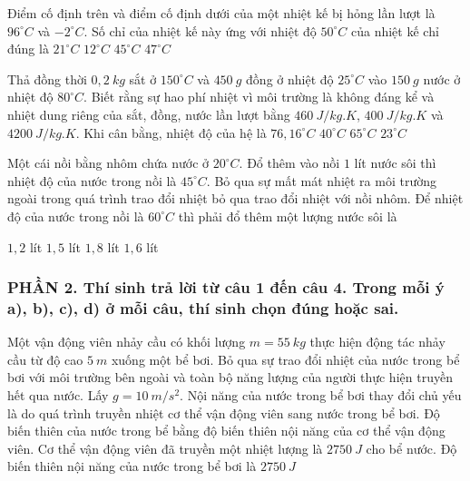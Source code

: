 \begin{ex}
Điểm cố định trên và điểm cố định dưới của một nhiệt kế bị hỏng lần lượt là $96^\circ C$ và $-2^\circ C$. Số chỉ của nhiệt kế này ứng với nhiệt độ $50^\circ C$ của nhiệt kế chỉ đúng là
\choice
{$21^\circ C$}
{$12^\circ C$}
{$45^\circ C$}
{\True $47^\circ C$}
	\loigiai{}
\end{ex}

\begin{ex}
	Thả đồng thời $0,2\ kg$ sắt ở $150^\circ C$ và $450\ g$ đồng ở nhiệt độ $25^\circ C$ vào $150\ g$ nước ở nhiệt độ $80^\circ C$. Biết rằng sự hao phí nhiệt vì môi trường là không đáng kể và nhiệt dung riêng của sắt, đồng, nước lần lượt bằng $460\ J/kg.K$, $400\ J/kg.K$ và $4200\ J/kg.K$. Khi cân bằng, nhiệt độ của hệ là
	\choice
	{\True $76,16^\circ C$}
	{$40^\circ C$}
	{$65^\circ C$}
	{$23^\circ C$}
	\loigiai{}
\end{ex}

\begin{ex}
Một cái nồi bằng nhôm chứa nước ở $20^{\circ}C$. Đổ thêm vào nồi $1$ lít nước sôi thì nhiệt độ của nước trong nồi là $45^{\circ}C$. Bỏ qua sự mất mát nhiệt ra môi trường ngoài trong quá trình trao đổi nhiệt bỏ qua trao đổi nhiệt với nồi nhôm. Để nhiệt độ của nước trong nồi là $60^{\circ}C$ thì phải đổ thêm một lượng nước sôi là

\choice
{\True $1,2$ lít}
{$1,5$ lít}
{$1,8$ lít}
{$1,6$ lít}
	\loigiai{}
\end{ex}
\subsubsection*{PHẦN 2. Thí sinh trả lời từ câu 1 đến câu 4. Trong mỗi ý a), b), c), d) ở mỗi câu, thí sinh chọn đúng hoặc sai.}
\setcounter{ex}{0}
\begin{ex}
	Một vận động viên nhảy cầu có khối lượng $m = 55\ kg$ thực hiện động tác nhảy cầu từ độ cao $5\ m$ xuống một bể bơi. Bỏ qua sự trao đổi nhiệt của nước trong bể bơi với môi trường bên ngoài và toàn bộ năng lượng của người thực hiện truyền hết qua nước. Lấy $g = 10\ m/s^2$.
	\choiceTFt
	{Nội năng của nước trong bể bơi thay đổi chủ yếu là do quá trình truyền nhiệt cơ thể vận động viên sang nước trong bể bơi.}
	{Độ biến thiên của nước trong bể bằng độ biến thiên nội năng của cơ thể vận động viên.}
	{Cơ thể vận động viên đã truyền một nhiệt lượng là $2750\ J$ cho bể nước.}
	{\True Độ biến thiên nội năng của nước trong bể bơi là $2750\ J$}
\end{ex}

